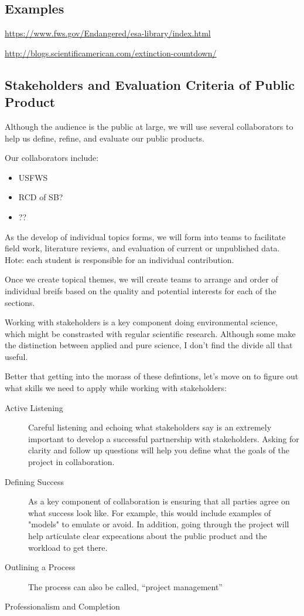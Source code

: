 \documentclass{article}\usepackage[]{graphicx}\usepackage[]{color}
\begin{document}
\subsection{Examples}

\href{https://www.fws.gov/Endangered/esa-library/index.html}{https://www.fws.gov/Endangered/esa-library/index.html}

\href{http://blogs.scientificamerican.com/extinction-countdown/}{http://blogs.scientificamerican.com/extinction-countdown/}

\subsection{Stakeholders and Evaluation Criteria of Public Product}

Although the audience is the public at large, we will use several collaborators to help us define, refine, and evaluate our public products.  

Our collaborators include: 

\begin{itemize}
  \item USFWS
  \item RCD of SB?
  \item ??
\end{itemize}

As the develop of individual topics forms, we will form into teams to facilitate field work, literature reviews, and evaluation of current or unpublished data. Hote: each student is responsible for an individual contribution. 

Once we create topical themes, we will create teams to arrange and order of  individual breifs based on the quality and potential interests for each of the sections.  

Working with stakeholders is a key component doing environmental science, which might be constrasted with regular scientific research. Although some make the distinction between applied and pure science, I don't find the divide all that useful. 

Better that getting into the morass of these defintions, let's move on to figure out what skills we need to apply while working with stakeholders:

\begin{description}
  \item[Active Listening] Careful listening and echoing what stakeholders say is an extremely important to develop a successful partnership with stakeholders. Asking for clarity and follow up questions will help you define what the goals of the project in collaboration.
  \item[Defining Success] As a key component of collaboration is ensuring that all parties agree on what success look like. For example, this would include examples of "models" to emulate or avoid. In addition, going through the project will help articulate clear expecations about the public product and the workload to get there.
  \item[Outlining a Process] The process can also be called, ``project management''
  \item[Professionalism and Completion]
\end{description}
\end{document}
